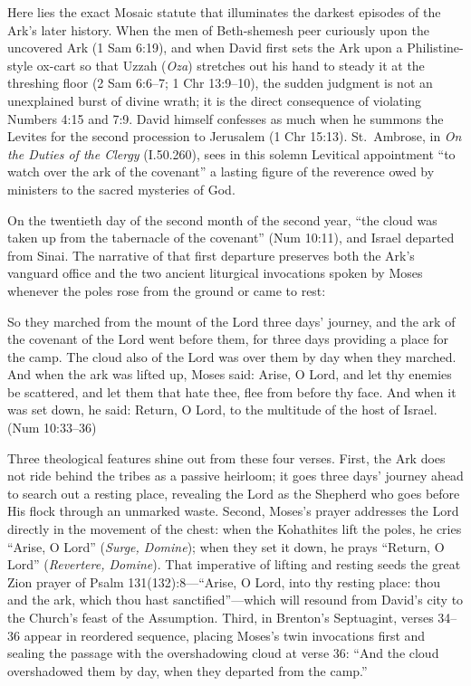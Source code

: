 Here lies the exact Mosaic statute that illuminates the darkest episodes of the Ark's later history. When the men of Beth-shemesh peer curiously upon the uncovered Ark (1 Sam 6:19), and when David first sets the Ark upon a Philistine-style ox-cart so that Uzzah (\textit{Oza}) stretches out his hand to steady it at the threshing floor (2 Sam 6:6--7; 1 Chr 13:9--10), the sudden judgment is not an unexplained burst of divine wrath; it is the direct consequence of violating Numbers 4:15 and 7:9. David himself confesses as much when he summons the Levites for the second procession to Jerusalem (1 Chr 15:13). St.\ Ambrose, in \textit{On the Duties of the Clergy} (I.50.260), sees in this solemn Levitical appointment ``to watch over the ark of the covenant'' a lasting figure of the reverence owed by ministers to the sacred mysteries of God.

On the twentieth day of the second month of the second year, ``the cloud was taken up from the tabernacle of the covenant'' (Num 10:11), and Israel departed from Sinai. The narrative of that first departure preserves both the Ark's vanguard office and the two ancient liturgical invocations spoken by Moses whenever the poles rose from the ground or came to rest:

\begin{scriptureblock}
So they marched from the mount of the Lord three days' journey, and the ark of the covenant of the Lord went before them, for three days providing a place for the camp. The cloud also of the Lord was over them by day when they marched. And when the ark was lifted up, Moses said: Arise, O Lord, and let thy enemies be scattered, and let them that hate thee, flee from before thy face. And when it was set down, he said: Return, O Lord, to the multitude of the host of Israel. \textnormal{(Num 10:33--36)}
\end{scriptureblock}

Three theological features shine out from these four verses. First, the Ark does not ride behind the tribes as a passive heirloom; it goes three days' journey ahead to search out a resting place, revealing the Lord as the Shepherd who goes before His flock through an unmarked waste. Second, Moses's prayer addresses the Lord directly in the movement of the chest: when the Kohathites lift the poles, he cries ``Arise, O Lord'' (\textit{Surge, Domine}); when they set it down, he prays ``Return, O Lord'' (\textit{Revertere, Domine}). That imperative of lifting and resting seeds the great Zion prayer of Psalm 131(132):8---``Arise, O Lord, into thy resting place: thou and the ark, which thou hast sanctified''---which will resound from David's city to the Church's feast of the Assumption. Third, in Brenton's Septuagint, verses 34--36 appear in reordered sequence, placing Moses's twin invocations first and sealing the passage with the overshadowing cloud at verse 36: ``And the cloud overshadowed them by day, when they departed from the camp.''

